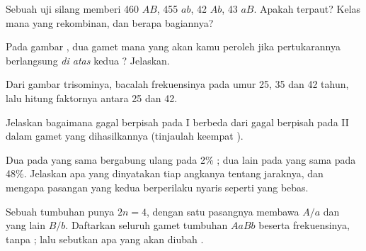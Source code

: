 \begin{exercise}[$\star\star$]\label{exo:g12:meiosis-genetic-shuffling:8}
Sebuah uji silang memberi 460 $AB$, 455 $ab$, 42 $Ab$, 43 $aB$. Apakah
 terpaut? Kelas mana yang rekombinan, dan berapa bagiannya?
\end{exercise}

\begin{exercise}[$\star\star$]\label{exo:g12:meiosis-genetic-shuffling:9}
Pada gambar , dua gamet mana yang akan kamu peroleh
jika pertukarannya berlangsung \emph{di atas} kedua ? Jelaskan.
\end{exercise}

\begin{exercise}[$\star\star$]\label{exo:g12:meiosis-genetic-shuffling:10}
Dari gambar trisominya, bacalah frekuensinya pada umur 25, 35 dan 42
tahun, lalu hitung faktornya antara 25 dan 42.
\end{exercise}

\begin{exercise}[$\star\star$]\label{exo:g12:meiosis-genetic-shuffling:11}
Jelaskan bagaimana gagal berpisah pada  I berbeda dari gagal
berpisah pada  II dalam gamet yang dihasilkannya (tinjaulah
keempat ).
\end{exercise}

\begin{exercise}[$\star\star\star$]\label{exo:g12:meiosis-genetic-shuffling:12}
Dua  pada  yang sama bergabung ulang pada 2\% ;
dua  lain pada  yang sama pada 48\%. Jelaskan apa yang
dinyatakan tiap angkanya tentang jaraknya, dan mengapa pasangan yang
kedua berperilaku nyaris seperti  yang bebas.
\end{exercise}

\begin{exercise}[$\star\star\star$]\label{exo:g12:meiosis-genetic-shuffling:13}
Sebuah tumbuhan punya $2n = 4$, dengan satu pasangnya membawa $A/a$ dan
yang lain $B/b$. Daftarkan seluruh gamet tumbuhan $AaBb$ beserta
frekuensinya, tanpa ; lalu sebutkan apa yang akan diubah
.
\end{exercise}

